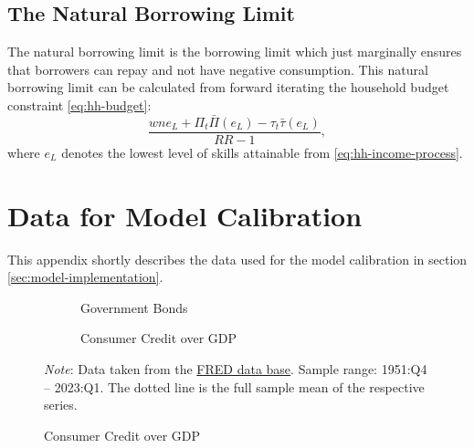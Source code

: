 \documentclass[12pt]{article} %
\numberwithin{equation}{section} %
\begin{document}
\begin{refsection}
\begin{appendices}
\subsection{The Natural Borrowing Limit}
\label{sec:app-hh-borrowing}
The natural borrowing limit is the borrowing limit which just marginally ensures that borrowers can repay and not have negative consumption. This natural borrowing limit can be calculated from forward iterating the household budget constraint \eqref{eq:hh-budget}:
\begin{equation*}
    \frac{wne_{L} + \Pi_t \bar{\Pi} (e_{L}) - \tau_t \bar{\tau} (e_{L})}{RR - 1},
\end{equation*}
where $e_L$ denotes the lowest level of skills attainable from \eqref{eq:hh-income-process}.

\thispagestyle{plain}
\section{Data for Model Calibration}
\label{sec-app:data}

This appendix shortly describes the data used for the model calibration in section \ref{sec:model-implementation}.

\begin{figure}[H]
    \caption{Time Series of Data for the Model Calibration}
    \centering
    \begin{subfigure}[b]{0.49\textwidth}
    \caption{Government Bonds} %
    \label{fig:app-calibration-bonds}
         \centering
         
     \end{subfigure}
     \hfill
     \begin{subfigure}[b]{0.49\textwidth}
     \caption{Consumer Credit over GDP} %
    \label{fig:app-calibration-debt}
         \centering
         
     \end{subfigure}
     \begin{flushleft}
     \footnotesize
	\textit{Note}: Data taken from the \href{https://fred.stlouisfed.org}{FRED data base}. Sample range: 1951:Q4 -- 2023:Q1. The dotted line is the full sample mean of the respective series.
	\end{flushleft}
\end{figure}


\end{appendices}
\end{refsection}
\end{document}
